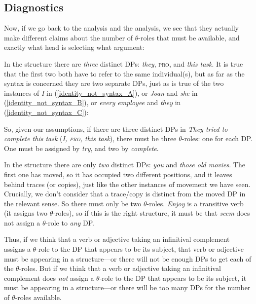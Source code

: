 \documentclass{article}
\begin{document}
\normalsize
    \subsection{Diagnostics}
Now, if we go back to the  analysis and the  analysis, we see that they actually make different claims about the number of $\theta$-roles that must be available, and exactly what head is selecting what argument:

In the  structure there are \emph{three} distinct DPs:  \emph{they}, \textsc{pro}, and \emph{this task}.
It is true that the first two both have to refer to the same individual(s), but as far as the syntax is concerned they are two separate DPs, just as is true of the two instances of \emph{I} in (\ref{identity_not_syntax_A}), or \emph{Joan} and \emph{she} in (\ref{identity_not_syntax_B}), or \emph{every employee} and \emph{they} in (\ref{identity_not_syntax_C}): 
\begin{exe}
\end{exe}
So, given our assumptions, if there are three distinct DPs in \emph{They tried to complete this task} (\emph{I, \textsc{pro}, this task}), there must be three $\theta$-roles: one for each DP.
One must be assigned by \emph{try}, and two by \emph{complete}.

In the  structure there are only \textit{two} distinct DPs: \emph{you} and \emph{those old movies}.
The first one has moved, so it has occupied two different positions, and it leaves behind traces (or copies), just like the other instances of movement we have seen.
Crucially, we don't consider that a trace/copy is distinct from the moved DP in the relevant sense.
So there must only be two $\theta$-roles.
\emph{Enjoy} is a transitive verb (it assigns two $\theta$-roles), so if this is the right structure, it must be that \emph{seem} does not assign a $\theta$-role to \emph{any} DP.

Thus, if we think that a verb or adjective taking an infinitival complement assigns a $\theta$-role to the DP that appears to be its subject, that verb or adjective must be appearing in a  structure---or there will not be enough DPs to get each of the $\theta$-roles.
But if we think that a verb or adjective taking an infinitival complement does \emph{not} assign a $\theta$-role to the DP that appears to be its subject, it must be appearing in a  structure---or there will be too many DPs for the number of $\theta$-roles available.
\end{document}
